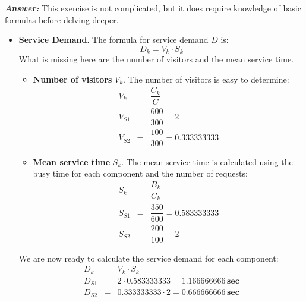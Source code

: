 \begin{enumerate}
    \textcolor{Green3}{\textbf{\emph{Answer:}}} This exercise is not complicated, but it does require knowledge of basic formulas before delving deeper.
    \begin{itemize}
        \item \textbf{Service Demand}. The formula for service demand $D$ is:
        \begin{equation*}
            D_{k} = V_{k} \cdot S_{k}
        \end{equation*}
        What is missing here are the number of visitors and the mean service time.
        \begin{itemize}
            \item \textbf{Number of visitors} $V_{k}$. The number of visitors is easy to determine:
            \begin{equation*}
                \begin{array}{rcl}
                    V_{k} &=& \dfrac{C_{k}}{C} \\ [1.1em]
                    V_{S1} &=& \dfrac{600}{300} = 2 \\ [1.1em]
                    V_{S2} &=& \dfrac{100}{300} = 0.333333333
                \end{array}
            \end{equation*}
            \item \textbf{Mean service time} $S_{k}$. The mean service time is calculated using the busy time for each component and the number of requests:
            \begin{equation*}
                \begin{array}{rcl}
                    S_{k} &=& \dfrac{B_{k}}{C_{k}} \\ [1.1em]
                    S_{S1} &=& \dfrac{350}{600} = 0.583333333 \\ [1.1em]
                    S_{S2} &=& \dfrac{200}{100} = 2
                \end{array}
            \end{equation*}
        \end{itemize}
        We are now ready to calculate the service demand for each component:
        \begin{equation*}
            \begin{array}{rcl}
                D_{k} &=& V_{k} \cdot S_{k} \\ [.5em]
                D_{S1} &=& 2 \cdot 0.583333333 = \mathbf{1.16}6666666 \, \textbf{sec} \\ [.5em]
                D_{S2} &=& 0.333333333 \cdot 2 = \mathbf{0.66}6666666 \, \textbf{sec}
            \end{array}
        \end{equation*}


\end{itemize}
\end{enumerate}
